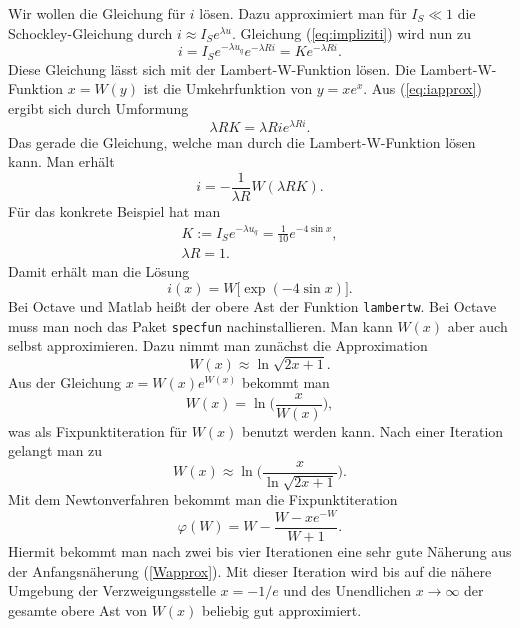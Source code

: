 \documentclass[a4paper,10pt,fleqn,twocolumn,twoside]{scrartcl}
\numberwithin{equation}{section}
\begin{document}
Wir wollen die Gleichung für $i$ lösen. Dazu approximiert man für
$I_S\ll 1$ die Schockley-Gleichung durch $i\approx I_S e^{\lambda u}$.
Gleichung (\ref{eq:impliziti}) wird nun zu%
\begin{equation}\label{eq:iapprox}
i=I_Se^{-\lambda u_q}e^{-\lambda Ri} = Ke^{-\lambda Ri}.
\end{equation}
Diese Gleichung lässt sich mit der Lambert-W-Funktion lösen.
Die Lambert-W-Funktion $x=W(y)$ ist die Umkehrfunktion von
$y=xe^x$. Aus (\ref{eq:iapprox}) ergibt sich durch Umformung%
\begin{equation}
\lambda RK = \lambda Rie^{\lambda Ri}.
\end{equation}
Das gerade die Gleichung, welche man durch die Lambert-W-Funktion
lösen kann. Man erhält%
\begin{equation}
i = -\frac{1}{\lambda R}W(\lambda RK).
\end{equation}
Für das konkrete Beispiel hat man
\begin{gather*}
K:=I_S e^{-\lambda u_q} = \frac{1}{10}e^{-4\sin x},\\
\lambda R = 1.
\end{gather*}
Damit erhält man die Lösung
\begin{equation}
i(x) = W[\exp(-4\sin x)\big].
\end{equation}
Bei Octave und Matlab heißt der obere Ast der Funktion
\texttt{lambertw}. Bei Octave muss man noch das Paket
\texttt{specfun} nachinstallieren. Man kann $W(x)$ aber auch
selbst approximieren. Dazu nimmt man zunächst die Approximation%
\begin{equation}\label{Wapprox}
W(x)\approx \ln\sqrt{2x+1}.
\end{equation}
Aus der Gleichung $x=W(x)e^{W(x)}$ bekommt man%
\begin{equation}
W(x) = \ln\Big(\frac{x}{W(x)}\Big),
\end{equation}
was als Fixpunktiteration für $W(x)$ benutzt werden kann.
Nach einer Iteration gelangt man zu%
\begin{equation}
W(x)\approx \ln\bigg(\frac{x}{\ln\sqrt{2x+1}}\bigg).
\end{equation}
Mit dem Newtonverfahren bekommt man die Fixpunktiteration%
\begin{equation}
\varphi(W) = W-\frac{W-xe^{-W}}{W+1}.
\end{equation}
Hiermit bekommt man nach zwei bis vier Iterationen eine sehr gute
Näherung aus der Anfangsnäherung (\ref{Wapprox}). Mit dieser
Iteration wird bis auf die nähere Umgebung der Verzweigungsstelle
$x=-1/e$ und des Unendlichen $x\rightarrow\infty$ der gesamte
obere Ast von $W(x)$ beliebig gut approximiert.
\end{document}
